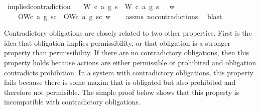 \begin{isabellebody}
{}%
\endisatagproof
{\isafoldproof}%
%
\isadelimproof
\isanewline
%
\endisadelimproof
\isanewline
{}\isamarkupfalse%
\ implied{\isacharunderscore}contradiction{\isacharcolon}\isanewline
\ \ \ {\isachardoublequoteopen}{\isacharparenleft}{\isacharparenleft}{\isacharparenleft}W\ {\isacharparenleft}c{}{\isacharcomma}\ a{}{\isacharcomma}\ g{}{\isacharparenright}\ s{\isacharparenright}\ \isactrlbold {\isasymand}\ {\isacharparenleft}W\ {\isacharparenleft}c{}{\isacharcomma}\ a{}{\isacharcomma}\ g{}{\isacharparenright}\ s{\isacharparenright}{\isacharparenright}\ \isactrlbold {\isasymrightarrow}\ \isactrlbold {\isasymbottom}{\isacharparenright}\ w{\isachardoublequoteclose}\isanewline
\ \ \ {\isachardoublequoteopen}\isactrlbold {\isasymnot}\ {\isacharparenleft}O{\isacharbraceleft}W{\isacharparenleft}c{}{\isacharcomma}\ a{}{\isacharcomma}\ g{}{\isacharparenright}\ s{\isacharbar}c{\isacharbraceright}\ \isactrlbold {\isasymand}\ O{\isacharbraceleft}W{\isacharparenleft}c{}{\isacharcomma}\ a{}{\isacharcomma}\ g{}{\isacharparenright}\ s{\isacharbar}c{\isacharbraceright}{\isacharparenright}\ w{\isachardoublequoteclose}\isanewline
%
\isadelimproof
\ \ %
\endisadelimproof
%
\isatagproof
{}\isamarkupfalse%
\ assms\ no{\isacharunderscore}contradictions\ \isamarkupfalse%
\ blast\isanewline
%
%
\endisatagproof
{\isafoldproof}%
%
\isadelimproof
%
\endisadelimproof
%
\begin{isamarkuptext}%
Contradictory obligations are closely related to two other properties. First is the idea that obligation implies permissibility, or 
that obligation is a stronger property than permissibility. If there are no contradictory obligations, 
then this property holds because actions are either permissible or prohibited and obligation contradicts
prohibition. In a system with contradictory obligations, this property fails because there is some
maxim that is obligated but also prohibited and therefore not permisible. The simple proof below 
shows that this property is incompatible with contradictory obligations.


\end{isamarkuptext}
\end{isabellebody}
